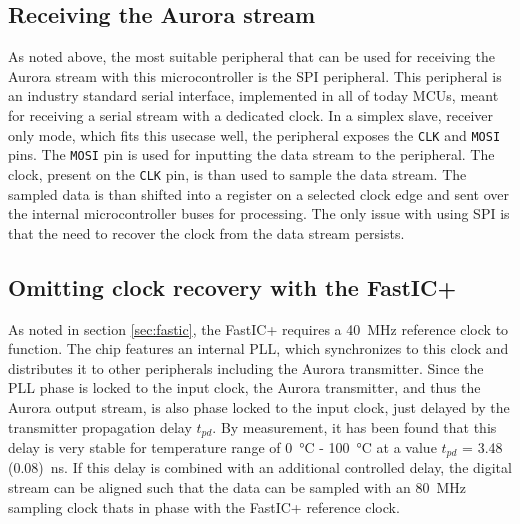 \subsection{Receiving the Aurora stream}
As noted above, the most suitable peripheral that can be used for receiving the Aurora stream with this microcontroller is the SPI peripheral. This peripheral is an industry standard serial interface, implemented in all of today MCUs, meant for receiving a serial stream with a dedicated clock. In a simplex slave, receiver only mode, which fits this usecase well, the peripheral exposes the \verb|CLK| and \verb|MOSI| pins. The \verb|MOSI| pin is used for inputting the data stream to the peripheral. The clock, present on the \verb|CLK| pin, is than used to sample the data stream. The sampled data is than shifted into a register on a selected clock edge and sent over the internal microcontroller buses for processing. The only issue with using SPI is that the need to recover the clock from the data stream persists.

\subsection{Omitting clock recovery with the FastIC+}
As noted in section \ref{sec:fastic}, the FastIC+ requires a \SI{40}{\mega\hertz} reference clock to function. The chip features an internal PLL, which synchronizes to this clock and distributes it to other peripherals including the Aurora transmitter. Since the PLL phase is locked to the input clock, the Aurora transmitter, and thus the Aurora output stream, is also phase locked to the input clock, just delayed by the transmitter propagation delay $t_{pd}$. By measurement, it has been found that this delay is very stable for temperature range of \SI{0}{\celsius} - \SI{100}{\celsius} at a value $t_{pd}$ = \SI{3.48 (0.08)}{\nano\second}. If this delay is combined with an additional controlled delay, the digital stream can be aligned such that the data can be sampled with an \SI{80}{\mega\hertz} sampling clock thats in phase with the FastIC+ reference clock. 

